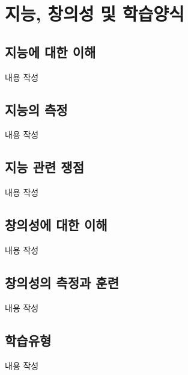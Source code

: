 \section{지능, 창의성 및 학습양식}

\subsection{지능에 대한 이해}
내용 작성

\subsection{지능의 측정}
내용 작성

\subsection{지능 관련 쟁점}
내용 작성

\subsection{창의성에 대한 이해}
내용 작성

\subsection{창의성의 측정과 훈련}
내용 작성

\subsection{학습유형}
내용 작성
